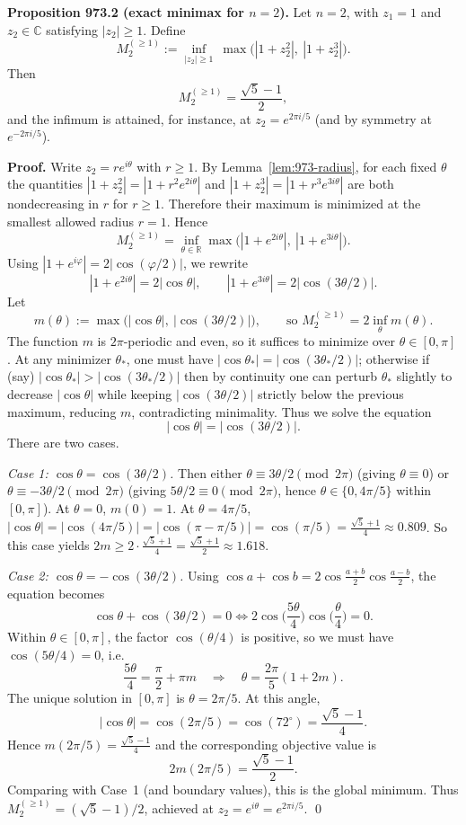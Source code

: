 \medskip
\noindent\textbf{Proposition 973.2 (exact minimax for $n=2$).}\label{prop:973-n2}
Let $n=2$, with $z_1=1$ and $z_2\in\mathbb{C}$ satisfying $|z_2|\ge 1$.
Define
\[
M_2^{(\ge 1)}:=\inf_{|z_2|\ge 1}\ \max\big(|1+z_2^2|,\ |1+z_2^3|\big).
\]
Then
\[
M_2^{(\ge 1)}=\frac{\sqrt5-1}{2},
\]
and the infimum is attained, for instance, at $z_2=e^{2\pi i/5}$ (and by symmetry at $e^{-2\pi i/5}$).

\noindent\textbf{Proof.}
Write $z_2=re^{i\theta}$ with $r\ge 1$.
By Lemma~\ref{lem:973-radius}, for each fixed $\theta$ the quantities $|1+z_2^2|=|1+r^2 e^{2i\theta}|$ and $|1+z_2^3|=|1+r^3 e^{3i\theta}|$ are both nondecreasing in $r$ for $r\ge 1$.
Therefore their maximum is minimized at the smallest allowed radius $r=1$.
Hence
\[
M_2^{(\ge 1)} = \inf_{\theta\in\mathbb{R}} \max\big(|1+e^{2i\theta}|,\ |1+e^{3i\theta}|\big).
\]
Using $|1+e^{i\varphi}|=2|\cos(\varphi/2)|$, we rewrite
\[
|1+e^{2i\theta}|=2|\cos\theta|,\qquad |1+e^{3i\theta}|=2|\cos(3\theta/2)|.
\]
Let
\[
m(\theta):=\max\big(|\cos\theta|,\ |\cos(3\theta/2)|\big),\qquad\text{so }M_2^{(\ge 1)}=2\inf_{\theta} m(\theta).
\]
The function $m$ is $2\pi$-periodic and even, so it suffices to minimize over $\theta\in[0,\pi]$.
At any minimizer $\theta_*$, one must have $|\cos\theta_*|=|\cos(3\theta_*/2)|$; otherwise if (say) $|\cos\theta_*|>|\cos(3\theta_*/2)|$ then by continuity one can perturb $\theta_*$ slightly to decrease $|\cos\theta|$ while keeping $|\cos(3\theta/2)|$ strictly below the previous maximum, reducing $m$, contradicting minimality.
Thus we solve the equation
\[
|\cos\theta|=|\cos(3\theta/2)|.
\]
There are two cases.

\emph{Case 1: $\cos\theta=\cos(3\theta/2)$.}
Then either $\theta\equiv 3\theta/2\pmod{2\pi}$ (giving $\theta\equiv 0$) or $\theta\equiv -3\theta/2\pmod{2\pi}$ (giving $5\theta/2\equiv 0\pmod{2\pi}$, hence $\theta\in\{0,4\pi/5\}$ within $[0,\pi]$).
At $\theta=0$, $m(0)=1$.  At $\theta=4\pi/5$, $|\cos\theta|=|\cos(4\pi/5)|=|\cos(\pi-\pi/5)|=\cos(\pi/5)=\frac{\sqrt5+1}{4}\approx 0.809$.
So this case yields $2m\ge 2\cdot \frac{\sqrt5+1}{4}=\frac{\sqrt5+1}{2}\approx 1.618$.

\emph{Case 2: $\cos\theta=-\cos(3\theta/2)$.}
Using $\cos a+\cos b=2\cos\frac{a+b}{2}\cos\frac{a-b}{2}$, the equation becomes
\[
\cos\theta+\cos(3\theta/2)=0
\iff 2\cos\Big(\frac{5\theta}{4}\Big)\cos\Big(\frac{\theta}{4}\Big)=0.
\]
Within $\theta\in[0,\pi]$, the factor $\cos(\theta/4)$ is positive, so we must have $\cos(5\theta/4)=0$, i.e.
\[
\frac{5\theta}{4}=\frac{\pi}{2}+\pi m \quad\Longrightarrow\quad \theta=\frac{2\pi}{5}(1+2m).
\]
The unique solution in $[0,\pi]$ is $\theta=2\pi/5$.
At this angle,
\[
|\cos\theta|=\cos(2\pi/5)=\cos(72^\circ)=\frac{\sqrt5-1}{4}.
\]
Hence $m(2\pi/5)=\frac{\sqrt5-1}{4}$ and the corresponding objective value is
\[
2m(2\pi/5)=\frac{\sqrt5-1}{2}.
\]
Comparing with Case~1 (and boundary values), this is the global minimum.
Thus $M_2^{(\ge 1)}=(\sqrt5-1)/2$, achieved at $z_2=e^{i\theta}=e^{2\pi i/5}$. \qed

